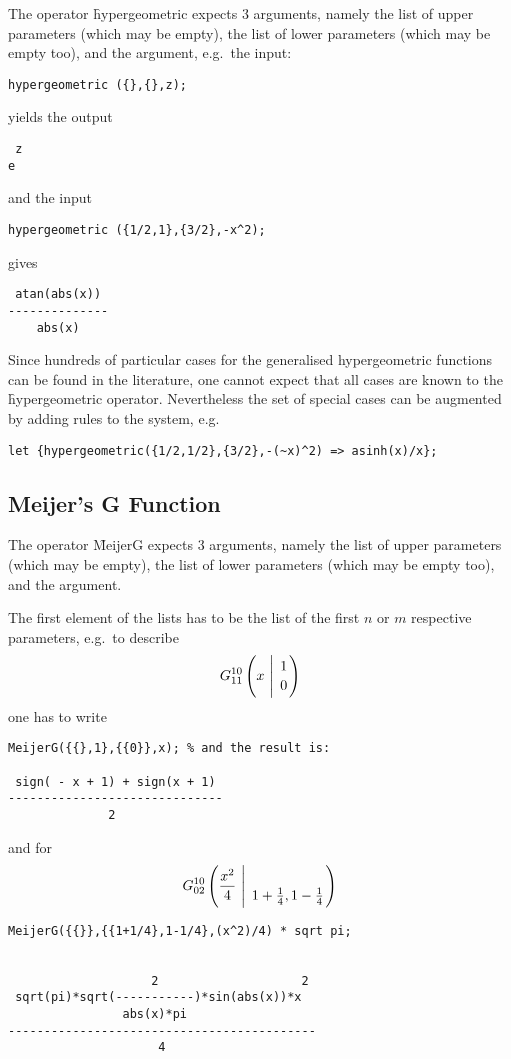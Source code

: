 The operator \f{hypergeometric} expects 3 arguments, namely the 
list of upper parameters (which may be empty), the list of lower
parameters (which may be empty too), and the argument, e.g.\ the input:
\begin{verbatim}
hypergeometric ({},{},z);
\end{verbatim}
yields the output
\begin{verbatim}
 z
e
\end{verbatim}
and the input
\begin{verbatim}
hypergeometric ({1/2,1},{3/2},-x^2);
\end{verbatim}
gives
\begin{verbatim}
 atan(abs(x))
--------------
    abs(x)
\end{verbatim}


Since hundreds of particular cases for the generalised hypergeometric
functions can be found in the literature, one cannot expect that all
cases are known to the \f{hypergeometric} operator.
Nevertheless the set of special cases can be augmented by adding
rules to the \REDUCE{} system, e.g.
\begin{verbatim}
let {hypergeometric({1/2,1/2},{3/2},-(~x)^2) => asinh(x)/x};
\end{verbatim}

\subsection{Meijer's G Function}
\hypertarget{operator:MEIJERG}{}

The operator \f{MeijerG} expects 3 arguments, namely the 
list of upper parameters (which may be empty), the list of lower
parameters (which may be empty too), and the argument.

The first element of the lists has to be the list of the
first $n$ or $m$ respective parameters, e.g.\ to describe 
\[
G_{1 1}^{1 0} \left( x \  \Bigg\vert \  \genfrac{}{}{0pt}{}{1}{0} \right)
\]
one has to write 
\begin{verbatim}
MeijerG({{},1},{{0}},x); % and the result is:

 sign( - x + 1) + sign(x + 1)
------------------------------
              2
\end{verbatim}
and for
\[
G_{0 2}^{1 0} \left( \frac{x^2}{4} \  \Bigg\vert \ \genfrac{}{}{0pt}{}{}{{1+ \frac{1}{4} },
{1-\frac{1}{4}}} \right)
\]
\begin{verbatim}
MeijerG({{}},{{1+1/4},1-1/4},(x^2)/4) * sqrt pi;


                    2                    2
 sqrt(pi)*sqrt(-----------)*sin(abs(x))*x
                abs(x)*pi
-------------------------------------------
                     4
\end{verbatim}

